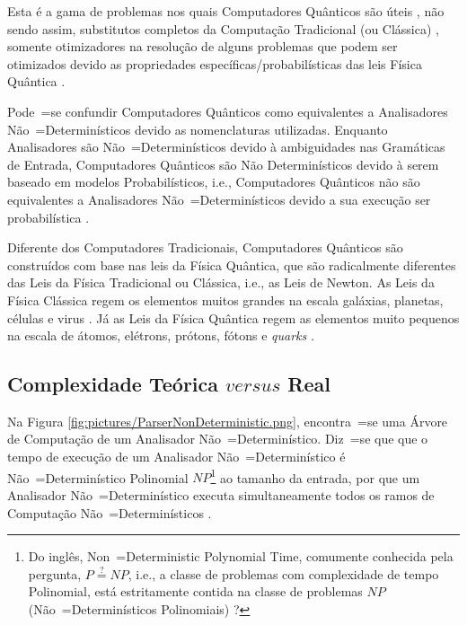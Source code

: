 {{    Esta é a gama de problemas nos quais Computadores Quânticos são úteis \cite{quantumComputingForNonPhysicists},
    não sendo assim,
    substitutos completos da Computação Tradicional (ou Clássica) \cite{efficientQuantumComputation},
    somente otimizadores na resolução de alguns problemas que podem ser otimizados devido as propriedades específicas\slash{}probabilísticas das leis Física Quântica \cite{churchTuringQuantumComputer}.

    Pode~=se confundir Computadores Quânticos como equivalentes a Analisadores Não~=Determinísticos devido as nomenclaturas utilizadas.
    Enquanto Analisadores são Não~=Determinísticos devido à ambiguidades nas Gramáticas de Entrada,
    Computadores Quânticos são Não Determinísticos devido à serem baseado em modelos Probabilísticos,
    i.e.,
    Computadores Quânticos não são equivalentes a Analisadores Não~=Determinísticos devido a sua execução ser probabilística \cite{polynomialQuantumComputers,probabilisticQuantumComputation,quantumSimulatorChagas}.

    Diferente dos Computadores Tradicionais,
    Computadores Quânticos são construídos com base nas leis da Física Quântica,
    que são radicalmente diferentes das Leis da Física Tradicional ou
    Clássica, i.e.,
    as Leis de Newton.
    As Leis da Física Clássica regem os elementos muitos grandes na escala galáxias,
    planetas, células e
    virus \cite{halliday2013fundamentals}.
    Já as Leis da Física Quântica regem as elementos muito pequenos na escala de átomos,
    elétrons, prótons, fótons e
    \textit{quarks} \cite{dicke1963QuantumPhysicsIntroduction}.
}

\subsection{Complexidade Teórica $versus$ Real}

    Na Figura \ref{fig:pictures/ParserNonDeterministic.png},
    encontra~=se uma Árvore de Computação de um Analisador Não~=Determinístico.
    Diz~=se que que o tempo de execução de um Analisador Não~=Determinístico é Não~=Determinístico  Polinomial $NP$\footnote{
    Do inglês, Non~=Deterministic Polynomial Time,
    comumente conhecida pela pergunta,
    $P \stackrel{?}{=} NP$, i.e.,
    a classe de problemas com complexidade de tempo Polinomial,
    está estritamente contida na classe de problemas $NP$ (Não~=Determinísticos Polinomiais) \cite{computationalComplexityAuroraBarak}?
    } ao tamanho da entrada,
    por que um Analisador Não~=Determinístico executa simultaneamente todos os ramos de Computação Não~=Determinísticos \cite{hopcroftBook}.

}
